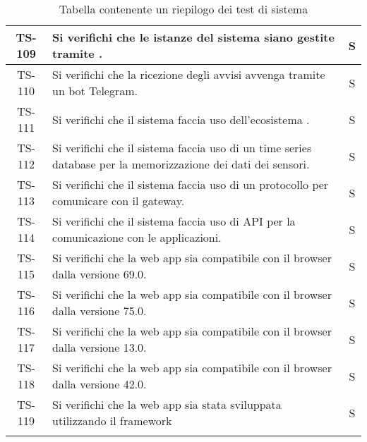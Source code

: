 \begin{center}
\begin{longtable}{|c|p{10cm}|c|}
			 TS-109 & Si verifichi che le istanze del sistema siano gestite tramite \glock{Docker}. & S \\
			 \hline
			 TS-110 & Si verifichi che la ricezione degli avvisi avvenga tramite un bot Telegram. & S \\
			 \hline
			 TS-111 & Si verifichi che il sistema faccia uso dell'ecosistema \glock{Kafka}. & S \\
			 \hline
			 TS-112 & Si verifichi che il sistema faccia uso di un time series database per la memorizzazione dei dati dei sensori. & S \\
			 \hline
			 TS-113 & Si verifichi che il sistema faccia uso di un protocollo per comunicare con il gateway. & S \\
			 \hline
			 TS-114 & Si verifichi che il sistema faccia uso di API per la comunicazione con le applicazioni. & S \\
			 \hline
			 TS-115 & Si verifichi che la web app sia compatibile con il browser \glock{Firefox} dalla versione 69.0. & S \\
			 \hline
			 TS-116 & Si verifichi che la web app sia compatibile con il browser \glock{Chrome} dalla versione 75.0. & S \\
			 \hline
			 TS-117 & Si verifichi che la web app sia compatibile con il browser \glock{Safari} dalla versione 13.0. & S \\
			 \hline
			 TS-118 & Si verifichi che la web app sia compatibile con il browser \glock{Edge} dalla versione 42.0. & S \\
			 \hline
			 TS-119 & Si verifichi che la web app sia stata sviluppata utilizzando il framework \glock{Bootstrap} & S \\
			 \hline

			 \caption{Tabella contenente un riepilogo dei test di sistema}
			\end{longtable}
		\end{center}
		
